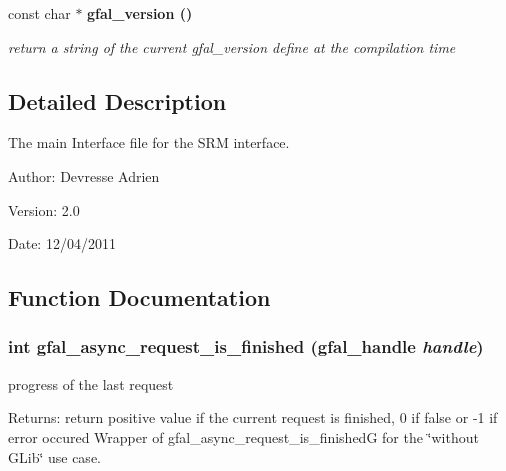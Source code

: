 \begin{CompactItemize}
\item 
const char $\ast$ \bf{gfal\_\-version} ()
\begin{CompactList}\small\item\em return a string of the current gfal\_\-version define at the compilation time \item\end{CompactList}\end{CompactItemize}


\subsection{Detailed Description}
The main Interface file for the SRM interface. 

\begin{Desc}
\item[Author:]Devresse Adrien \end{Desc}
\begin{Desc}
\item[Version:]2.0 \end{Desc}
\begin{Desc}
\item[Date:]12/04/2011 \end{Desc}


\subsection{Function Documentation}
\subsubsection{\setlength{\rightskip}{0pt plus 5cm}int gfal\_\-async\_\-request\_\-is\_\-finished (gfal\_\-handle {\em handle})}\label{gfal__common__interface_8h_ce6fcac8e92ad2e1d699eed2ce74a257}


progress of the last request 

\begin{Desc}
\item[Returns:]return positive value if the current request is finished, 0 if false or -1 if error occured Wrapper of gfal\_\-async\_\-request\_\-is\_\-finished\-G for the \char`\"{}without GLib\char`\"{} use case. \end{Desc}
